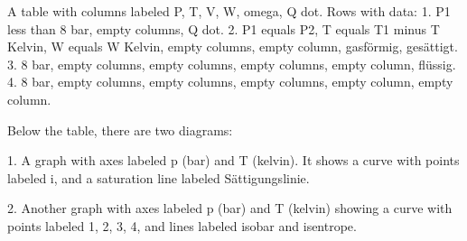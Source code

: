 A table with columns labeled P, T, V, W, omega, Q dot. Rows with data:
1. P1 less than 8 bar, empty columns, Q dot.
2. P1 equals P2, T equals T1 minus T Kelvin, W equals W Kelvin, empty columns, empty column, gasförmig, gesättigt.
3. 8 bar, empty columns, empty columns, empty columns, empty column, flüssig.
4. 8 bar, empty columns, empty columns, empty columns, empty column, empty column.

Below the table, there are two diagrams:

1. A graph with axes labeled p (bar) and T (kelvin). It shows a curve with points labeled i, and a saturation line labeled Sättigungslinie.

2. Another graph with axes labeled p (bar) and T (kelvin) showing a curve with points labeled 1, 2, 3, 4, and lines labeled isobar and isentrope.